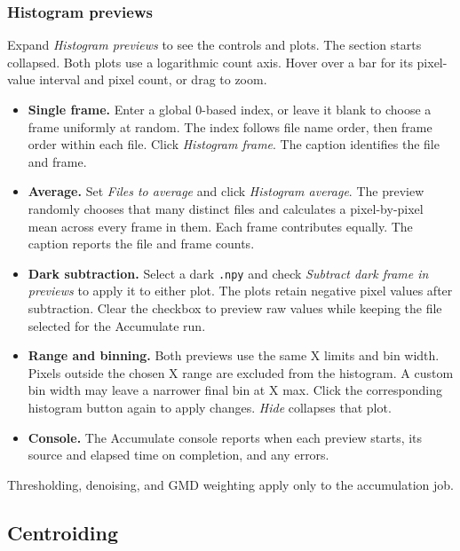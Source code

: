 \documentclass[11pt,a4paper]{article}
\newcommand{\code}[1]{\texttt{#1}}
\begin{document}
\subsubsection{Histogram previews}
\label{sec:framepreview}

Expand \emph{Histogram previews} to see the controls and plots.
The section starts collapsed. Both plots use a logarithmic count axis.
Hover over a bar for its pixel-value interval and pixel count, or drag to zoom.

\begin{itemize}
  \item \textbf{Single frame.} Enter a global 0-based index, or leave it blank
        to choose a frame uniformly at random. The index follows file name
        order, then frame order within each file. Click \emph{Histogram frame}.
        The caption identifies the file and frame.
  \item \textbf{Average.} Set \emph{Files to average} and click
        \emph{Histogram average}. The preview randomly chooses that many
        distinct files and calculates a pixel-by-pixel mean across every
        frame in them. Each frame contributes equally. The caption reports
        the file and frame counts.
  \item \textbf{Dark subtraction.} Select a dark \code{.\allowbreak{}npy} and check
        \emph{Subtract dark frame in previews} to apply it to either plot.
        The plots retain negative pixel values after subtraction. Clear the
        checkbox to preview raw values while keeping the file selected for
        the Accumulate run.
  \item \textbf{Range and binning.} Both previews use the same X limits and bin
        width. Pixels outside the chosen X range are excluded from the
        histogram. A custom bin width may leave a narrower final bin at X max.
        Click the corresponding histogram button again to apply changes.
        \emph{Hide} collapses that plot.
  \item \textbf{Console.} The Accumulate console reports when each preview
        starts, its source and elapsed time on completion, and any errors.
\end{itemize}

Thresholding, denoising, and GMD weighting apply only to the accumulation job.

\subsection{Centroiding}
\label{sec:centroiding}
\end{document}
